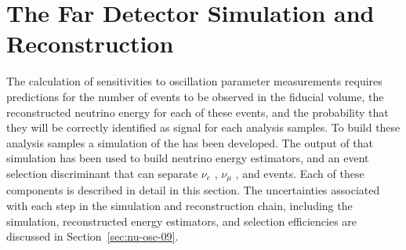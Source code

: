 \section{The Far Detector Simulation and Reconstruction}\label{sec:nu-osc-07}\label{sec:physics-lbnosc-FD}
\label{sec:physics-lbnosc-simreco}


The calculation of  sensitivities to oscillation parameter measurements requires predictions for the number of events to be observed in the  fiducial volume, the reconstructed neutrino energy for each of these events, and the probability that they will be correctly identified as signal for each analysis samples. To build these analysis samples a   simulation of the  has been developed. The output of that simulation has been used to build neutrino energy estimators, and an event selection discriminant that can separate $\nu_{e}$ , $\nu_{\mu}$ , and  events. Each of these components is described in detail in this section. The uncertainties associated with each step in the simulation and reconstruction chain, including the  simulation, reconstructed energy estimators, and selection efficiencies are discussed in Section~\ref{sec:nu-osc-09}. 


